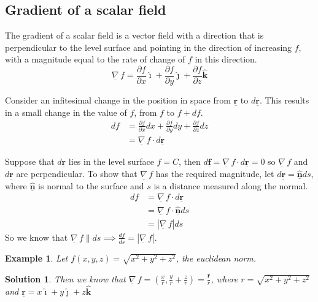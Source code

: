 \documentclass{article}
\renewcommand{\vec}[1]{\underline{\textbf{#1}}}
\newcommand{\veci}{\bm{\hat{\imath}}}
\newcommand{\vecj}{\bm{\hat{\jmath}}}
\newcommand{\veck}{\bm{\hat{k}}}
\newcommand{\vecn}{\underline{\mathbf{\hat{n}}}}
\newcommand{\nab}{\underline{\nabla}}
\newcommand{\grad}{{\nab}\, f}
\newcommand{\pd}[2]{\frac{\partial #1}{\partial #2}}
\newtheorem{example}{Example}
\newtheorem{solution}{Solution}
\begin{document}
\subsection{Gradient of a scalar field}
\noindent\begin{definition}{}{}
  The gradient of a scalar field is a vector field with a direction that is perpendicular to the level surface and pointing in the direction of increasing $f$, with a magnitude equal to the rate of change of $f$ in this direction.
  $$ \grad = \pd{f}{x}\veci + \pd{f}{y}\vecj + \pd{f}{z}\veck $$
\end{definition}\vspace{10pt}

Consider an infitesimal change in the position in space from $\vec r$ to $d\vec r$. This results in a small change in the value of $f$, from $f$ to $f+df$.
\begin{align*}
  df &= \pd{f}{x}dx + \pd{f}{y}dy + \pd{f}{z}dz\\
  &= \grad \cdot d\vec r
\end{align*}

\begin{figure}[H]
  \centering
\end{figure}

Suppose that $d\vec r$ lies in the level surface $f = C$, then $\displaystyle{d\vec f = \grad\cdot d\vec r = 0}$ so $\grad$ and $d\vec r$ are perpendicular. To show that $\grad$ has the required magnitude, let $d\vec r = \vecn ds$, where $\vecn$ is normal to the surface and $s$ is a distance measured along the normal.
\begin{align*}
  df &= \grad\cdot d\vec r\\
  &= \grad\cdot\vecn ds \\
  &= |\grad|ds
\end{align*}
So we know that $\displaystyle{\grad\parallel ds \implies \frac{df}{ds} = |\grad|}$.

\begin{example}{
   Let $f(x, y, z) = \sqrt{x^2 + y^2 + z^2}$, the euclidean norm.
}\end{example}\begin{solution}{
  Then we know that $\displaystyle{\grad = (\frac{x}{r}, \frac{y}{r} + \frac{z}{r}) = \frac{\vec r}{r}}$, where $r = \sqrt{x^2 + y^2 + z^2}$ and $\vec r = {x} \veci + {y} \vecj + {z} \veck$
}\end{solution}\vspace{10pt}
\end{document}
